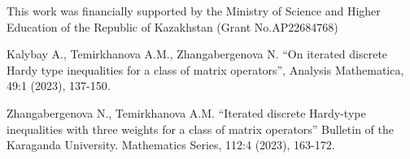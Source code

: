 \documentclass[12pt]{article}
\begin{document}
This work was financially supported by the Ministry of Science and Higher Education of the Republic of Kazakhstan (Grant No.AP22684768)

\begin{thebibliography}{00}\label{ref:ref}
Kalybay A., Temirkhanova A.M., Zhangabergenova N. “On iterated discrete Hardy type inequalities for a class of matrix operators”, Analysis Mathematica, 49:1 (2023), 137-150. 

Zhangabergenova N., Temirkhanova A.M. “Iterated discrete Hardy-type inequalities with three weights for a class of matrix operators” Bulletin of the Karaganda University. Mathematics Series, 112:4 (2023), 163-172.
\end{thebibliography}
\end{document}
